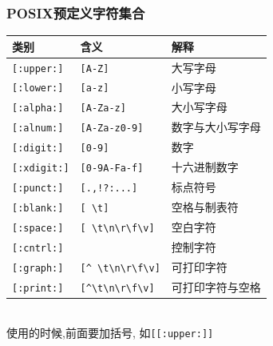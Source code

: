 \documentclass[compress]{beamer}
\begin{document}
\begin{frame}[fragile]
\frametitle{POSIX预定义字符集合}

\footnotesize

\begin{tabular}{|l|l|l|}\hline

类别 & 含义 & 解释 \\ \hline\hline

\verb=[:upper:]= & \verb=[A-Z]= & 大写字母 \\ \hline

\verb=[:lower:]= & \verb=[a-z]= & 小写字母 \\ \hline

\verb=[:alpha:]= & \verb=[A-Za-z]= & 大小写字母 \\ \hline

\verb=[:alnum:]= & \verb=[A-Za-z0-9]= & 数字与大小写字母 \\
\hline

\verb=[:digit:]= & \verb=[0-9]= & 数字 \\ \hline

\verb=[:xdigit:]= & \verb=[0-9A-Fa-f]= & 十六进制数字 \\ \hline

\verb=[:punct:]= & \verb=[.,!?:...]= & 标点符号 \\ \hline

\verb=[:blank:]= & \verb*=[ \t]= & 空格与制表符 \\ \hline

\verb=[:space:]= & \verb*=[ \t\n\r\f\v]= & 空白字符 \\ \hline

\verb=[:cntrl:]= & & 控制字符 \\ \hline

\verb=[:graph:]= & \verb*=[^ \t\n\r\f\v]= & 可打印字符 \\
\hline

\verb=[:print:]= &  \verb=[^\t\n\r\f\v]= & 可打印字符与空格 \\
\hline

\end{tabular}\\

使用的时候,前面要加括号, 如{\verb=[[:upper:]]=}

\end{frame}
\end{document}
